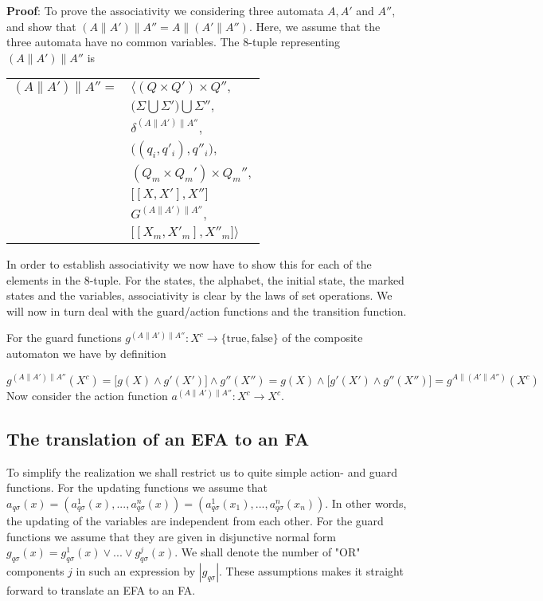 \documentclass{article}
\begin{document}
\noindent \textbf{Proof}: To prove the associativity we
considering three automata $A, A'$ and $A''$, and show that
$(A\|A')\|A'' = A\|(A'\|A'')$. Here, we assume that the three
automata have no common variables.
\newline\newline
\noindent The 8-tuple representing $(A\|A')\|A''$ is
\begin{center}
\begin{tabular}{ll}
  $(A\|A')\|A'' =$ & $\Big \langle (Q \times Q') \times Q'',$\\
  & $ \big(\Sigma \bigcup \Sigma' \big) \bigcup \Sigma'',$\\
  & $\delta^{(A\|A')\|A''},$\\
  & $\big((q_i, q'_i) , q''_i\big),$\\
  & $(Q_m \times Q_m') \times Q_m'',$\\
  & $\big[[X, X'], X'']$\\
  & $G^{(A\|A')\|A''},$\\
  & $\big[[X_m, X'_m], X''_m \big] \Big \rangle$
\end{tabular}
\end{center}

\noindent In order to establish associativity we now have to show
this for each of the elements in the 8-tuple. For the states, the
alphabet, the initial state, the marked states and the variables,
associativity is clear by the laws of set operations. We will now
in turn deal with the guard/action functions and the transition
function.

For the guard functions $g^{(A\|A')\|A''} : X^c \rightarrow
\{\mathrm{true}, \mathrm{false}\}$ of the composite automaton we
have by definition

\begin{equation}
  g^{(A\|A')\|A''}(X^c) = \big[g(X) \wedge g'(X') \big] \wedge g''(X'') = g(X) \wedge \big[g'(X') \wedge g''(X'')] = g^{A\|(A'\|A'')}(X^c)
\end{equation}
\noindent Now consider the action function $a^{(A\|A')\|A''} : X^c
\rightarrow X^c$.
\newpage
\subsection{The translation of an EFA to  an FA}
To simplify the realization we shall restrict us to quite simple
action- and guard functions. For the updating functions we assume
that $a_{q \sigma}(x)=(a^1_{q \sigma}(x),...,a^n_{q
\sigma}(x))=(a^1_{q \sigma}(x_1),...,a^n_{q \sigma}(x_n))$. In
other words, the updating of the variables are independent from
each other. For the guard functions we assume that they are given
in disjunctive normal form $g_{q \sigma}(x)=g^1_{q \sigma}(x)\vee
...\vee g^j_{q \sigma}(x)$. We shall denote the number of "OR"
components $j$ in such an expression by $|g_{q \sigma}|$. These
assumptions makes it straight forward to translate an EFA to an
FA.
\end{document}
